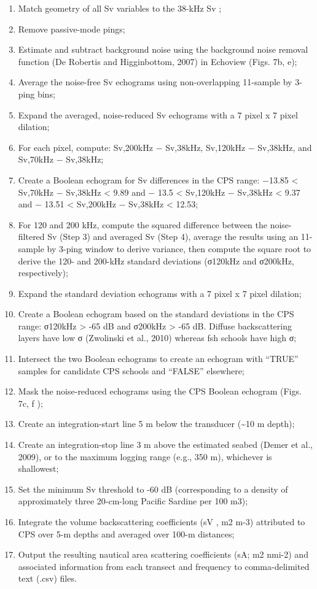 \documentclass[
  letterpaper,
  oneside,
  open=any]{scrbook}
\providecommand{\tightlist}{%
  \setlength{\itemsep}{0pt}\setlength{\parskip}{0pt}}\usepackage{longtable,booktabs,array}
\begin{document}
\begin{enumerate}
\def\labelenumi{\arabic{enumi}.}
\tightlist
\item
  Match geometry of all Sv variables to the 38-kHz Sv ;
\item
  Remove passive-mode pings;
\item
  Estimate and subtract background noise using the background noise
  removal function (De Robertis and Higginbottom, 2007) in Echoview
  (Figs. 7b, e);
\item
  Average the noise-free Sv echograms using non-overlapping 11-sample by
  3-ping bins;
\item
  Expand the averaged, noise-reduced Sv echograms with a 7 pixel x 7
  pixel dilation;
\item
  For each pixel, compute: Sv,200kHz − Sv,38kHz, Sv,120kHz − Sv,38kHz,
  and Sv,70kHz − Sv,38kHz;
\item
  Create a Boolean echogram for Sv differences in the CPS range: −13.85
  \textless{} Sv,70kHz − Sv,38kHz \textless{} 9.89 and − 13.5
  \textless{} Sv,120kHz − Sv,38kHz \textless{} 9.37 and − 13.51
  \textless{} Sv,200kHz − Sv,38kHz \textless{} 12.53;
\item
  For 120 and 200 kHz, compute the squared difference between the
  noise-filtered Sv (Step 3) and averaged Sv (Step 4), average the
  results using an 11-sample by 3-ping window to derive variance, then
  compute the square root to derive the 120- and 200-kHz standard
  deviations (σ120kHz and σ200kHz, respectively);
\item
  Expand the standard deviation echograms with a 7 pixel x 7 pixel
  dilation;
\item
  Create a Boolean echogram based on the standard deviations in the CPS
  range: σ120kHz \textgreater{} -65 dB and σ200kHz \textgreater{} -65
  dB. Diffuse backscattering layers have low σ (Zwolinski et al., 2010)
  whereas fsh schools have high σ;
\item
  Intersect the two Boolean echograms to create an echogram with
  ``TRUE'' samples for candidate CPS schools and ``FALSE'' elsewhere;
\item
  Mask the noise-reduced echograms using the CPS Boolean echogram (Figs.
  7c, f );
\item
  Create an integration-start line 5 m below the transducer
  (\textasciitilde10 m depth);
\item
  Create an integration-stop line 3 m above the estimated seabed (Demer
  et al., 2009), or to the maximum logging range (e.g., 350 m),
  whichever is shallowest;
\item
  Set the minimum Sv threshold to -60 dB (corresponding to a density of
  approximately three 20-cm-long Pacific Sardine per 100 m3);
\item
  Integrate the volume backscattering coefficients (sV , m2 m-3)
  attributed to CPS over 5-m depths and averaged over 100-m distances;
\item
  Output the resulting nautical area scattering coefficients (sA; m2
  nmi-2) and associated information from each transect and frequency to
  comma-delimited text (.csv) files.
\end{enumerate}
\end{document}

